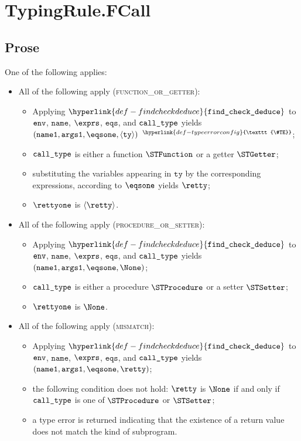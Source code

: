 \documentclass{book}
\newcommand\TypeErrorConfig[0]{\hyperlink{def-typeerrorconfig}{\texttt{\#TE}}}
\newcommand\ProseOrTypeError[0]{\hyperlink{def-proseortypeerror}{$^{\TypeErrorConfig}$}}
\newcommand\findcheckdeduce[0]{\hyperlink{def-findcheckdeduce}{\texttt{find\_check\_deduce}}}
\newcommand\tty[0]{\texttt{ty}}
\newcommand\eqs[0]{\texttt{eqs}}
\newcommand\nameone[0]{\texttt{name1}}
\newcommand\vargsone[0]{\texttt{args1}}
\newcommand\name[0]{\texttt{name}}
\begin{document}
\section{TypingRule.FCall \label{sec:TypingRule.FCall}}
\subsection{Prose}
One of the following applies:
\begin{itemize}
  \item All of the following apply (\textsc{function\_or\_getter}):
  \begin{itemize}
    \item Applying $\findcheckdeduce$ to $\texttt{env}$, $\name$, $\exprs$, $\eqs$, and $\texttt{call\_type}$
    yields $(\nameone, \vargsone, \eqsone, \langle \tty \rangle)$ \ProseOrTypeError;
    \item $\texttt{call\_type}$ is either a function $\STFunction$ or a getter $\STGetter$;
    \item substituting the variables appearing in $\tty$ by the corresponding expressions,
    according to $\eqsone$ yields $\retty$;
    \item $\rettyone$ is $\langle\retty\rangle$.
  \end{itemize}

  \item All of the following apply (\textsc{procedure\_or\_setter}):
  \begin{itemize}
    \item Applying $\findcheckdeduce$ to $\texttt{env}$, $\name$, $\exprs$, $\eqs$, and $\texttt{call\_type}$
    yields $(\nameone, \vargsone, \eqsone, \None)$;
    \item $\texttt{call\_type}$ is either a procedure $\STProcedure$ or a setter $\STSetter$;
    \item $\rettyone$ is $\None$.
  \end{itemize}

  \item All of the following apply (\textsc{mismatch}):
  \begin{itemize}
    \item Applying $\findcheckdeduce$ to $\texttt{env}$, $\name$, $\exprs$, $\eqs$, and $\texttt{call\_type}$
    yields $(\nameone, \vargsone, \eqsone, \retty)$;
    \item the following condition does not hold:
    $\retty$ is $\None$ if and only if $\texttt{call\_type}$ is one of $\STProcedure$ or $\STSetter$;
    \item a type error is returned indicating that the existence of a return value does not match
    the kind of subprogram.
  \end{itemize}
\end{itemize}
\end{document}
